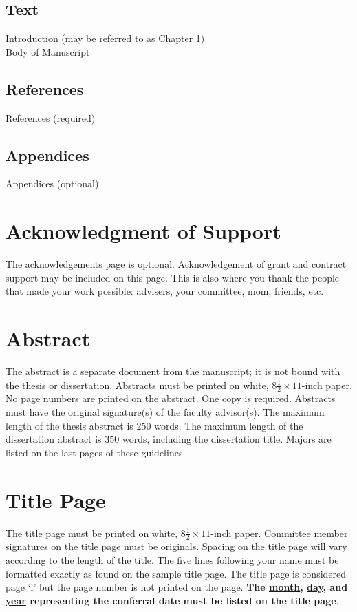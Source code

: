 \subsection{Text}
Introduction (may be referred to as Chapter 1) \\
Body of Manuscript


\subsection{References}
References (required)

\subsection{Appendices}
Appendices (optional)


\section{Acknowledgment of Support}
The acknowledgements page is optional. Acknowledgement of grant and contract support may be included on this page. This is also where you thank the people that made your work possible: advisers, your committee, mom, friends,  etc.

\section{Abstract}
The abstract is a separate document from the manuscript; it is not bound with the thesis or dissertation. Abstracts must be printed on white, $8\frac{1}{2} \times 11$-inch paper. No page numbers are printed on the abstract. One copy is required. Abstracts must have the original signature(s) of the faculty advisor(s). The maximum length of the thesis abstract is 250 words. The maximum length of the dissertation abstract is 350 words, including the dissertation title. Majors are listed on the last pages of these guidelines. 

\section{Title Page}
The title page must be printed on white, $8\frac{1}{2} \times 11$-inch paper. Committee member signatures on the title page must be originals. Spacing on the title page will vary according to the length of the title. The five lines following your name must be formatted exactly as found on the sample title page. The title page is considered page ‘i’ but the page number is not printed on the page. \textbf{The \underline{month}, \underline{day}, and \underline{year} representing the conferral date must be listed on the title page}. 


